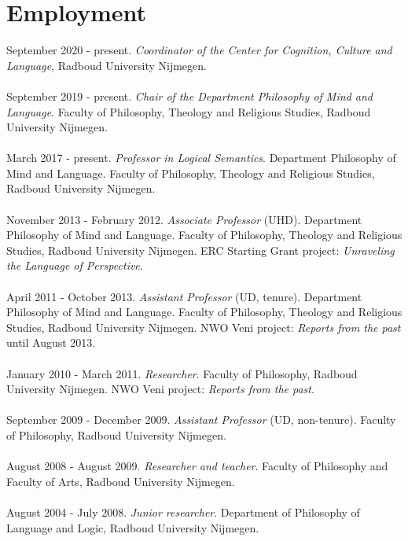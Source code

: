\documentclass[a4paper,11pt]{article}
\begin{document}
\section*{Employment}

September 2020 - present. \emph{Coordinator of the Center for Cognition, Culture and Language}, Radboud University Nijmegen.\\\\
September 2019 - present. \emph{Chair of the Department Philosophy of Mind and Language}. Faculty of Philosophy, Theology and Religious Studies, Radboud University Nijmegen.\\\\
March 2017 - present. \emph{Professor in Logical Semantics}.  Department Philosophy of Mind and Language. Faculty of Philosophy, Theology and Religious Studies, Radboud University Nijmegen.\\\\
November 2013 - February 2012. \emph{Associate Professor} (UHD).  Department Philosophy of Mind and Language. Faculty of Philosophy, Theology and Religious Studies, Radboud University Nijmegen. ERC Starting Grant project: \emph{Unraveling the Language of Perspective}.\\\\
April 2011 - October 2013. \emph{Assistant Professor} (UD, tenure). Department Philosophy of Mind and Language. Faculty of Philosophy, Theology and Religious Studies, Radboud University Nijmegen.  NWO Veni project: \emph{Reports from the past} until August 2013.\\\\
January 2010 - March 2011.  \emph{Researcher}. Faculty of Philosophy, Radboud University Nijmegen.
NWO Veni project: \emph{Reports from the past}.\\\\
September 2009 - December 2009. \emph{Assistant Professor} (UD, non-tenure). Faculty of Philosophy, Radboud University Nijmegen.\\\\ 
August 2008 - August 2009. \emph{Researcher and teacher}. Faculty of Philosophy and Faculty of Arts, Radboud University Nijmegen.\\\\
August 2004 - July 2008. \emph{Junior researcher}. Department of
Philosophy of Language and Logic, Radboud University Nijmegen.\\\\
\end{document}
